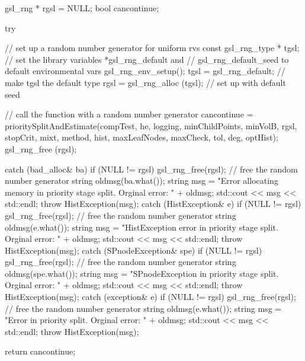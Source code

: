 \begin{DoxyCode}
{
    gsl_rng * rgsl = NULL;
    bool cancontinue;

    try {
        // set up a random number generator for uniform rvs
        const gsl_rng_type * tgsl;
        // set the library variables *gsl_rng_default and
        // gsl_rng_default_seed to default environmental vars
        gsl_rng_env_setup();
        tgsl = gsl_rng_default; // make tgsl the default type
        rgsl = gsl_rng_alloc (tgsl); // set up with default seed

        // call the function with a random number generator
        cancontinue = prioritySplitAndEstimate(compTest, he, logging, 
      minChildPoints, 
                        minVolB, rgsl, stopCrit, mixt, method, hist,
                        maxLeafNodes, maxCheck, tol, deg, optHist);
        gsl_rng_free (rgsl);
    }

    catch (bad_alloc& ba) {
        if (NULL != rgsl) gsl_rng_free(rgsl); // free the random number
       generator
        string oldmsg(ba.what());
        string msg = "Error allocating memory in priority stage split.  Orginal
       error: "
                                     + oldmsg;
        std::cout << msg << std::endl;
        throw HistException(msg);
    }
    catch (HistException& e) {
        if (NULL != rgsl) gsl_rng_free(rgsl); // free the random number
       generator
        string oldmsg(e.what());
        string msg = "HistException error in priority stage split.  Orginal
       error: "
                                    + oldmsg;
        std::cout << msg << std::endl;
        throw HistException(msg);
    }
    catch (SPnodeException& spe) {
        if (NULL != rgsl) gsl_rng_free(rgsl); // free the random number
       generator
        string oldmsg(spe.what());
        string msg = "SPnodeException in priority stage split.  Orginal error: 
      "
                                    + oldmsg;
        std::cout << msg << std::endl;
        throw HistException(msg);
    }
    catch (exception& e) {
        if (NULL != rgsl) gsl_rng_free(rgsl); // free the random number
       generator
        string oldmsg(e.what());
        string msg = "Error in priority split.  Orginal error: " + oldmsg;
        std::cout << msg << std::endl;
        throw HistException(msg);
    }
   
   return cancontinue;
}
\end{DoxyCode}
